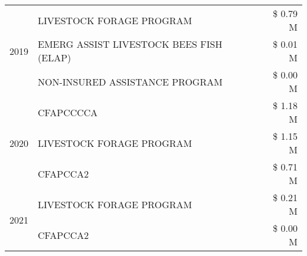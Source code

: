 \begin{tabular}{llr}
\multirow[t]{3}{*}{2019} & LIVESTOCK FORAGE PROGRAM & \$ 0.79 M \\
 & EMERG ASSIST LIVESTOCK BEES FISH (ELAP) & \$ 0.01 M \\
 & NON-INSURED ASSISTANCE PROGRAM & \$ 0.00 M \\
\cline{1-3}
\multirow[t]{3}{*}{2020} & CFAPCCCCA & \$ 1.18 M \\
 & LIVESTOCK FORAGE PROGRAM & \$ 1.15 M \\
 & CFAPCCA2 & \$ 0.71 M \\
\cline{1-3}
\multirow[t]{2}{*}{2021} & LIVESTOCK FORAGE PROGRAM & \$ 0.21 M \\
 & CFAPCCA2 & \$ 0.00 M \\
\cline{1-3}
\bottomrule
\end{tabular}
